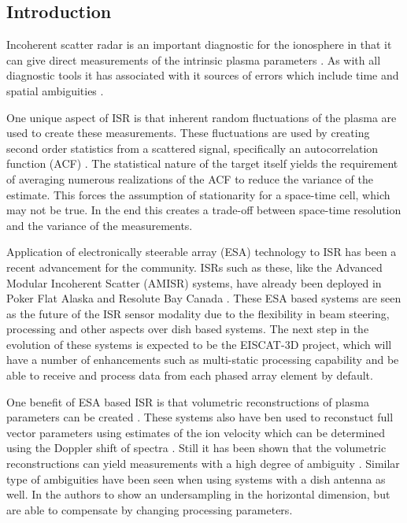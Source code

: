 \documentclass[draft,ras]{agutex}
\begin{document}
%

\begin{article}

\section{Introduction}
Incoherent scatter radar is an important diagnostic for the ionosphere in that it can give direct measurements of the intrinsic plasma parameters  \citep{dougherty:farley1960, farleydougherty:ISR2, doughteryfarley:ISR3, hagfors1961}. As with all diagnostic tools it has associated with it sources of errors which include time and spatial ambiguities \citep{farley1969, farleycomppower1969, hysell2008, RDS:RDS20236}.  

One unique aspect of ISR is that inherent random fluctuations of the plasma are used to create these measurements. These fluctuations are used by creating second order statistics from a scattered signal, specifically an autocorrelation function (ACF) \citep{farley1969}. The statistical nature of the target itself yields the requirement of averaging numerous realizations of the ACF to reduce the variance of the estimate. This forces the assumption of stationarity for a space-time cell, which may not be true. In the end this creates a trade-off between space-time resolution and the variance of the measurements.

Application of electronically steerable array (ESA) technology to ISR has been a recent advancement for the community. ISRs such as these, like the Advanced Modular Incoherent Scatter (AMISR) systems, have already been deployed in Poker Flat Alaska and Resolute Bay Canada \citep{Nicolls:2007ie, dahlgren2012di}. These ESA based systems are seen as the future of the ISR sensor modality due to the flexibility in beam steering, processing and other aspects over dish based systems. The next step in the evolution of these systems is expected to be the EISCAT-3D project, which will have a number of enhancements such as multi-static processing capability and be able to receive and process data from each phased array element by default.

One benefit of ESA based ISR is that volumetric reconstructions of plasma parameters can be created \citep{Semeter2009738, Nicolls:2007ie, dahlgren2012di}. These systems also have ben used to reconstuct full vector parameters using estimates of the ion velocity which can be determined using the Doppler shift of spectra \citep{butler:imagingfregiondrifts,RDS:RDS20195}. Still it has been shown that the volumetric reconstructions can yield measurements with a high degree of ambiguity \citep{Dahlgren:2012dq}. Similar type of ambiguities have been seen when using systems with a dish antenna as well. In \citet{Semeter:2005fo} the authors to show an undersampling in the horizontal dimension, but are able to compensate by changing processing parameters.


\end{article}
\end{document}
